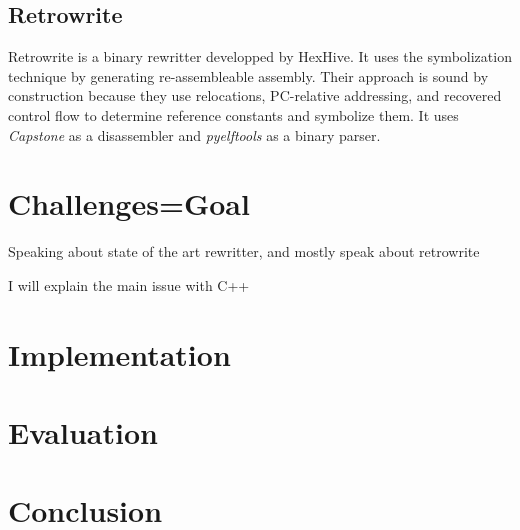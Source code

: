 \documentclass[a4paper,11pt,oneside]{report}
\begin{document}
\section{Retrowrite}
Retrowrite is a binary rewritter developped by HexHive. It uses the
symbolization technique by generating re-assembleable assembly. Their approach
is sound by construction because they use relocations, PC-relative addressing,
and recovered control flow to determine reference constants and symbolize them.
It uses \textit{Capstone} as a disassembler and \textit{pyelftools} as a binary parser.


\chapter{Challenges=Goal}
Speaking about state of the art rewritter, and mostly
speak about retrowrite

I will explain the main issue with C++

\chapter{Implementation}




\chapter{Evaluation}



%



\chapter{Conclusion}
\end{document}
